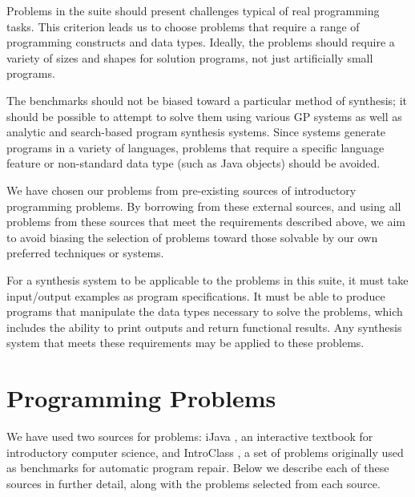 \documentclass{sig-alternate}
\begin{document}
Problems in the suite should present challenges typical of real programming tasks. 
This criterion leads us to choose problems that require a range of programming constructs and data types. Ideally, the problems should require a variety of sizes and shapes for solution programs, not just artificially small programs. 

The benchmarks should not be biased toward a particular method of synthesis; it should be possible to attempt to solve them using various GP systems as well as analytic and search-based program synthesis systems. Since systems generate programs in a variety of languages, problems that require a specific language feature or non-standard data type (such as Java objects) should be avoided.

We have chosen our problems from pre-existing sources of introductory programming problems. By borrowing from these external sources, and using all problems from these sources that meet the requirements described above, we aim to avoid biasing the selection of problems toward those solvable by our own preferred techniques or systems.

For a synthesis system to be applicable to the problems in this suite, it must take input/output examples as program specifications. It must be able to produce programs that manipulate the data types necessary to solve the problems, which includes the ability to print outputs and return functional results. Any synthesis system that meets these requirements may be applied to these problems.


\section{Programming Problems} \label{descriptionsSection}

We have used two sources for problems: iJava \cite{iJava}, an interactive textbook for introductory computer science, and IntroClass \cite{ManyBugsAndIntroClass, Brun13TRgptest}, a set of problems originally used as benchmarks for automatic program repair. Below we describe each of these sources in further detail, along with the problems selected from each source.
\end{document}
